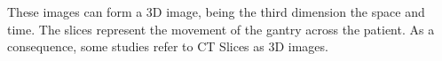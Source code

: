 
These images can form a 3D image, being the third dimension the space and time. The slices represent the movement of the gantry across the patient. As a consequence, some studies refer to CT Slices as 3D images.

